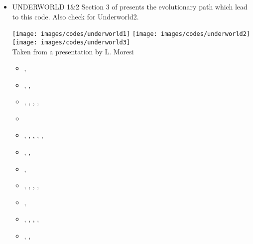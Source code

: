 \begin{itemize}
\item {\codefont UNDERWORLD 1\&2} 
Section 3 of \cite{qums07} presents the evolutionary path which lead to this code.
Also check \cite{magm20} for Underworld2. 

\begin{center}
\texttt{[image: images/codes/underworld1]}
\texttt{[image: images/codes/underworld2]}
\texttt{[image: images/codes/underworld3]}\\
{\captionfont Taken from a presentation by L. Moresi}
\end{center}


\begin{scriptsize}
\begin{itemize}
\item[\twothousandsix]       \textcite{stfs06},  \textcite{momu06}
\item[\twothousandseven]     \textcite{moql07},  \textcite{stfs07}, 
                             \textcite{qums07}
\item[\twothousandeight]     \textcite{lemm08},  \textcite{ozrs08}, 
                             \textcite{gotc08},  \textcite{stmt08},
                             \textcite{scsf11}
\item[\twothousandnine]      \textcite{stfm09} 
\item[\twothousandten]       \textcite{casm10},  \textcite{mamb10}, 
                             \textcite{stsf10},  \textcite{stfc10},
                             \textcite{fasm10},  \textcite{cazf10}
\item[\twothousandeleven]    \textcite{memm11},  \textcite{cafz11},  \textcite{leha11}
\item[\twothousandtwelve]    \textcite{cafa12},  \textcite{faca12}
\item[\twothousandthirteen]  \textcite{bemm12},  \textcite{scmo13}, 
                             \textcite{faca13},  \textcite{care13}, 
                             \textcite{coml13}
\item[\twothousandfourteen]  \textcite{famc14},  \textcite{shjm14}
\item[\twothousandfifteen]   \textcite{quxm15},  \textcite{bemm15}, 
                             \textcite{scsp15},  \textcite{shmj15}, 
                             \textcite{carr15}
\item[\twothousandsixteen]   \textcite{shmv16},  \textcite{onlw16}, 

\end{itemize}
\end{scriptsize}
\end{itemize}

